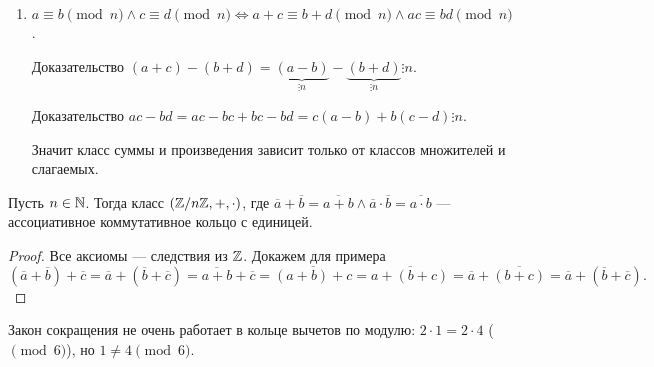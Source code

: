  \begin{enumerate}
     \item $a \equiv b \pmod{n} \land c \equiv d \pmod{n} \iff a+c \equiv b+d \pmod{n} \land ac \equiv bd \pmod{n}$. 

         Доказательство  $(a+c) - (b+d) = \underbrace{(a-b)}_{\vdots n} - \underbrace{(b+d)}_{\vdots n} \vdots n$. 

         Доказательство $ac - bd = ac - bc + bc - bd = c (a-b) + b(c-d) \vdots n$.

         Значит класс суммы и произведения зависит только от классов множителей и слагаемых.
\end{enumerate}
\begin{theorem}
    Пусть $n \in \mathbb{N}$. Тогда класс $(\mathbb{Z} / n\mathbb{Z}, +, \cdot)$, где $\overline{a}+\overline{b} = \overline{a+b} \land \overline{a} \cdot \overline{b} = \overline{a \cdot b}$ --- ассоциативное коммутативное кольцо с единицей.
\end{theorem}
\begin{proof}
    Все аксиомы --- следствия из $\mathbb{Z}$. Докажем для примера  $(\overline{a} + \overline{b}) + \overline{c} = \overline{a} + (\overline{b} + \overline{c}) = \overline{a+b} + \overline{c} = \overline{(a+b)+c} = \overline{a + (b+c)} = \overline{a} + \overline{(b+c)} = \overline{a} + (\overline{b} + \overline{c}).$
\end{proof}
\slashn
Закон сокращения не очень работает в кольце вычетов по модулю: $2 \cdot 1 = 2 \cdot 4$ ($\pmod 6$), но  $1 \neq 4 \pmod 6$.

